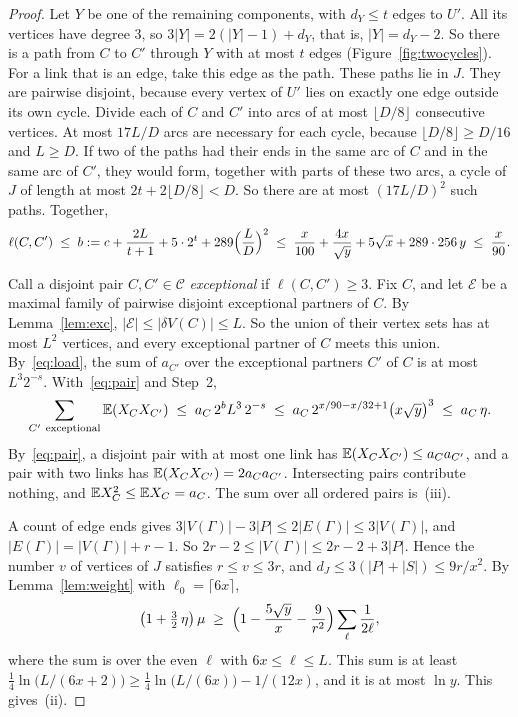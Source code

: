 \documentclass[11pt]{article}
\begin{document}
\begin{proof}
Let $Y$ be one of the remaining components, with $d_Y\le t$ edges to $U'$. All its vertices have
degree $3$, so $3|Y|=2(|Y|-1)+d_Y$, that is, $|Y|=d_Y-2$. So there is a path from $C$ to $C'$
through $Y$ with at most $t$ edges (Figure~\ref{fig:twocycles}). For a link that is an edge,
take this edge as the path. These
paths lie in $J$. They are pairwise disjoint, because every vertex of $U'$ lies on exactly one
edge outside its own cycle. Divide each of $C$ and $C'$ into arcs of at most $\lfloor D/8\rfloor$
consecutive vertices. At most $17L/D$ arcs are necessary for each cycle, because
$\lfloor D/8\rfloor\ge D/16$ and $L\ge D$. If two of the paths had their ends in the same arc of
$C$ and in the same arc of $C'$, they would form, together with parts of these two arcs, a cycle
of $J$ of length at most $2t+2\lfloor D/8\rfloor<D$. So there are at most $(17L/D)^{2}$ such
paths. Together,
\[
  \ell(C,C')\;\le\;b:=c+\frac{2L}{t+1}+5\cdot2^{t}+289\Bigl(\frac LD\Bigr)^{2}
  \;\le\;\frac{x}{100}+\frac{4x}{\sqrt y}+5\sqrt x+289\cdot256\,y\;\le\;\frac{x}{90}.
\]

 Call a disjoint pair $C,C'\in\mathcal{C}$ \emph{exceptional} if
$\ell(C,C')\ge3$. Fix $C$, and let $\mathcal{E}$ be a maximal family of pairwise disjoint
exceptional partners of $C$. By Lemma~\ref{lem:exc}, $|\mathcal{E}|\le|\delta V(C)|\le L$. So the
union of their vertex sets has at most $L^{2}$ vertices, and every exceptional partner of $C$
meets this union. By~\eqref{eq:load}, the sum of $a_{C'}$ over the exceptional partners $C'$ of $C$
is at most $L^{3}2^{-s}$. With~\eqref{eq:pair} and Step~2,
\[
  \sum_{C'\ \mathrm{exceptional}}\EE(X_CX_{C'})\;\le\;a_C\,2^{b}L^{3}\,2^{-s}
  \;\le\;a_C\,2^{x/90-x/32+1}\bigl(x\sqrt y\bigr)^{3}\;\le\;a_C\,\eta.
\]
By~\eqref{eq:pair}, a disjoint pair with at most one link has $\mathbb{E}(X_CX_{C'})\le a_Ca_{C'}$, and
a pair with two links has $\mathbb{E}(X_CX_{C'})=2a_Ca_{C'}$. Intersecting pairs contribute nothing, and
$\mathbb{E} X_C^{2}\le\mathbb{E} X_C=a_C$. The sum over all ordered pairs is~(iii).

 A count of edge ends gives
$3|V(\Gamma)|-3|P|\le2|E(\Gamma)|\le3|V(\Gamma)|$, and $|E(\Gamma)|=|V(\Gamma)|+r-1$. So
$2r-2\le|V(\Gamma)|\le2r-2+3|P|$. Hence the number $v$ of vertices of $J$ satisfies
$r\le v\le3r$, and $d_J\le3(|P|+|S|)\le9r/x^{2}$. By Lemma~\ref{lem:weight} with
$\ell_0=\lceil6x\rceil$,
\[
  \bigl(1+\tfrac32\,\eta\bigr)\,\mu\;\ge\;
  \Bigl(1-\frac{5\sqrt y}{x}-\frac{9}{r^{2}}\Bigr)\sum_{\ell}\frac1{2\ell},
\]
where the sum is over the even $\ell$ with $6x\le\ell\le L$. This sum is at least
$\frac14\ln\bigl(L/(6x+2)\bigr)\ge\frac14\ln\bigl(L/(6x)\bigr)-1/(12x)$, and it is at most $\ln y$.
This gives~(ii).
\end{proof}
\end{document}
